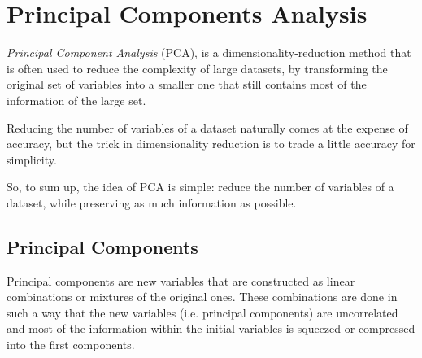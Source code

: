 %


\section{Principal Components Analysis}
\label{sec:pca}

\emph{Principal Component Analysis} (PCA), is a dimensionality-reduction method that is often used to reduce the complexity of large datasets, by transforming the original set of variables into a smaller one that still contains most of the information of the large set.

Reducing the number of variables of a dataset naturally comes at the expense of accuracy, but the trick in dimensionality reduction is to trade a little accuracy for simplicity. 

So, to sum up, the idea of PCA is simple: reduce the number of variables of a dataset, while preserving as much information as possible.

\subsection{Principal Components}

Principal components are new variables that are constructed as linear combinations or mixtures of the original ones. These combinations are done in such a way that the new variables (i.e. principal components) are uncorrelated and most of the information within the initial variables is squeezed or compressed into the first components. 

